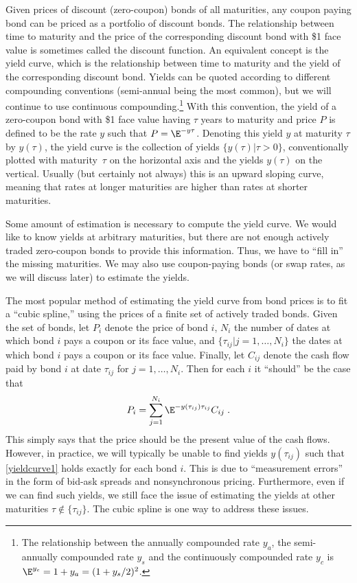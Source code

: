 Given prices of discount (zero-coupon) bonds of all maturities, any coupon paying bond can be priced as a portfolio of discount bonds.  The relationship between time to maturity and the price of the corresponding discount bond with \$1 face value is sometimes called the discount function.  An equivalent concept is the yield curve, which is the relationship between time to maturity and the yield of the corresponding discount bond.  Yields can be quoted according to different compounding conventions (semi-annual being the most common), but we will continue to use continuous compounding.\footnote{The relationship between the annually compounded rate $y_a$, the semi-annually compounded rate $y_s$ and the continuously compounded rate $y_c$ is  $\E^{y_c} = 1+y_a = (1+y_s/2)^2$.}
With this convention, the yield of a zero-coupon bond  with  \$1 face value having $\tau$ years to maturity and price $P$ is defined to be the rate $y$ such that
$P = \E^{-y\tau}$.  Denoting this yield $y$ at maturity $\tau$ by $y(\tau)$, the yield curve is the collection of yields $\{y(\tau)| \tau>0\}$, conventionally plotted with maturity~$\tau$ on the horizontal axis and the yields $y(\tau)$ on the vertical.  Usually (but certainly not always) this is an upward sloping curve, meaning that rates at longer maturities are higher than rates at shorter maturities.  

Some amount of estimation is necessary to compute the yield curve.  We would like to know yields at arbitrary maturities, but there are not enough actively traded zero-coupon bonds to provide this information.  Thus, we have to ``fill in'' the missing maturities.  We may also use coupon-paying bonds (or swap rates, as we will discuss later) to estimate the yields.

The most popular method of estimating the yield curve from bond prices is to fit a ``cubic spline,''  using the prices of a finite set of actively traded bonds.  Given the set of bonds, let $P_i$ denote the price of bond $i$, $N_i$ the number of dates at which bond $i$ pays a coupon or its face value, and $\{\tau_{ij}| j=1, \ldots, N_i\}$ the dates at which bond $i$ pays a coupon or its face value.  Finally, let $C_{ij}$ denote the cash flow paid by bond $i$ at date $\tau_{ij}$ for $j=1,\ldots,N_i$.  Then for each $i$ it ``should'' be the case that
\begin{equation}\label{yieldcurve1}
P_i = \sum_{j=1}^{N_i} \E^{-y(\tau_{ij})\tau_{ij}}C_{ij}\;.
\end{equation}
This simply says that the price should be the present value of the cash flows.  
However, in practice, we will typically be unable to find yields $y(\tau_{ij})$ such that \eqref{yieldcurve1} holds exactly for each bond $i$.  This is due to ``measurement errors'' in the form of bid-ask spreads and nonsynchronous pricing.  Furthermore, even if we can find such yields, we still face the issue of estimating the yields at other maturities $\tau \notin \{\tau_{ij}\}$.   The cubic spline is one way to address these issues.


